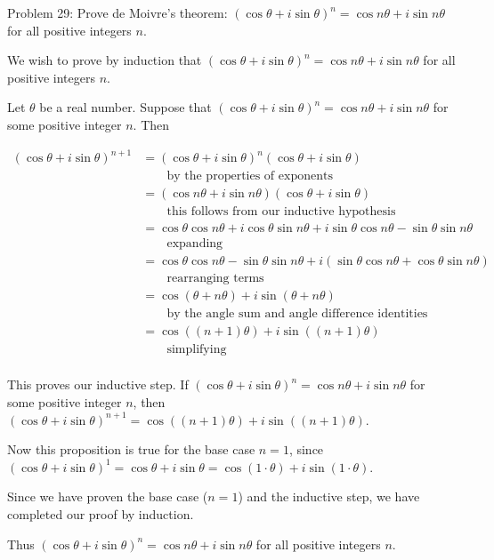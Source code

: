 Problem 29: Prove de Moivre's theorem: $(\cos \theta  + i \sin \theta)^n = \cos n\theta  + i \sin n\theta$ for all positive integers $n$.

We wish to prove by induction that $(\cos \theta  + i \sin \theta)^n = \cos n\theta  + i \sin n\theta$ for all positive integers $n$.

Let $\theta$ be a real number. Suppose that $(\cos \theta  + i \sin \theta)^n = \cos n\theta  + i \sin n\theta$ for some positive integer $n$. Then

\begin{align*}
(\cos \theta  + i \sin \theta)^{n+1} &= (\cos \theta  + i \sin \theta)^n (\cos \theta  + i \sin \theta) \\ &\qquad \text{by the properties of exponents} \\
&= (\cos n\theta  + i \sin n\theta) (\cos \theta  + i \sin \theta) \\ &\qquad \text{this follows from our inductive hypothesis} \\
&= \cos \theta \cos n\theta  + i \cos \theta \sin n\theta + i \sin \theta \cos n\theta - \sin \theta \sin n\theta \\ &\qquad \text{expanding} \\
&= \cos \theta \cos n\theta - \sin \theta \sin n\theta + i(\sin \theta \cos n\theta + \cos \theta \sin n\theta) \\ &\qquad \text{rearranging terms} \\
&= \cos (\theta + n \theta) + i\sin(\theta + n \theta) \\ &\qquad \text{by the angle sum and angle difference identities} \\
&= \cos((n+1)\theta) + i\sin ((n+1)\theta) \\ &\qquad \text{simplifying} \\
\end{align*}

This proves our inductive step. If $(\cos \theta  + i \sin \theta)^n = \cos n\theta  + i \sin n\theta$ for some positive integer $n$, then $(\cos \theta  + i \sin \theta)^{n+1} = \cos ((n+1)\theta)  + i \sin ((n+1)\theta)$.

Now this proposition is true for the base case $n=1$, since $(\cos \theta  + i \sin \theta)^1 = \cos \theta  + i \sin \theta = \cos (1 \cdot \theta)  + i \sin (1 \cdot \theta)$.

Since we have proven the base case ($n = 1$) and the inductive step, we have completed our proof by induction.

Thus $(\cos \theta  + i \sin \theta)^n = \cos n\theta  + i \sin n\theta$ for all positive integers $n$.
